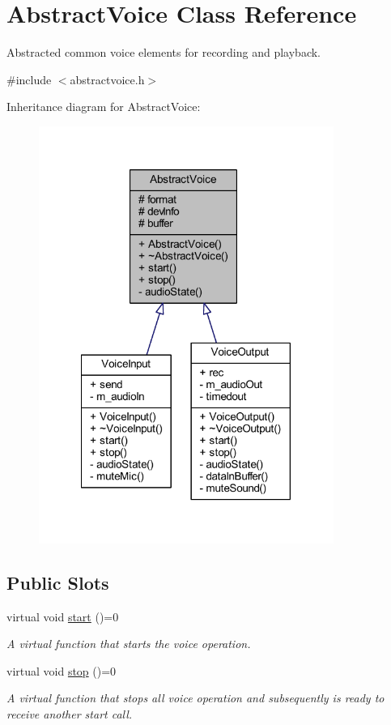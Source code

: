 \hypertarget{class_abstract_voice}{
\section{\-Abstract\-Voice \-Class \-Reference}
\label{class_abstract_voice}
}


\-Abstracted common voice elements for recording and playback.  




{\ttfamily \#include $<$abstractvoice.\-h$>$}



\-Inheritance diagram for \-Abstract\-Voice\-:\nopagebreak
\begin{figure}[H]
\begin{center}
\leavevmode
\includegraphics[width=273pt]{class_abstract_voice__inherit__graph}
\end{center}
\end{figure}
\subsection*{\-Public \-Slots}
\begin{DoxyCompactItemize}
\item 
virtual void \hyperlink{class_abstract_voice_a5e6f942915e9ef55babd7070225266ce}{start} ()=0
\begin{DoxyCompactList}\small\item\em \-A virtual function that starts the voice operation. \end{DoxyCompactList}\item 
virtual void \hyperlink{class_abstract_voice_aae2a6c918a63938881faefd9909508a0}{stop} ()=0
\begin{DoxyCompactList}\small\item\em \-A virtual function that stops all voice operation and subsequently is ready to receive another start call. \end{DoxyCompactList}\end{DoxyCompactItemize}
